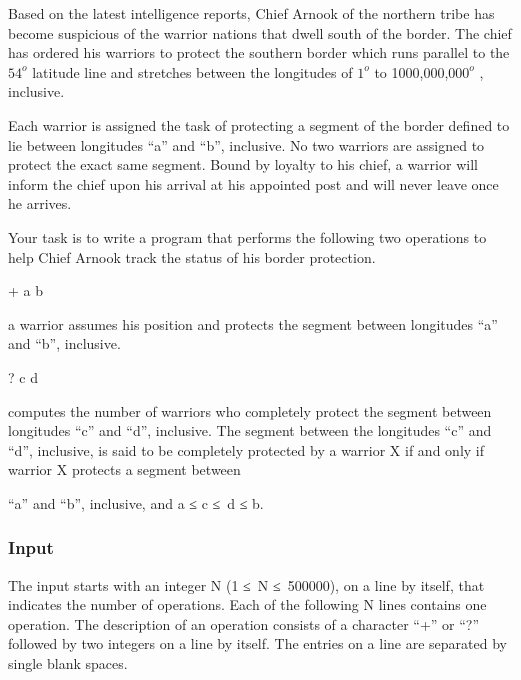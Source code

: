 



     Based on the latest intelligence reports, Chief Arnook of the northern tribe has become suspicious of the warrior nations that dwell south of the border. The chief has ordered his warriors to protect the southern border which runs parallel to the $54^{o}$     latitude line and stretches between the longitudes of $1^{o}$     to 1000,000,$000^{o}$     , inclusive.    

     Each warrior is assigned the task of protecting a segment of the border defined to lie between longitudes “a” and “b”, inclusive. No two warriors are assigned to protect the exact same segment. Bound by loyalty to his chief, a warrior will inform the chief upon his arrival at his appointed post and will never leave once he arrives.    

         Your task is to write a program that performs the following two operations                   to help Chief Arnook track the status of his border protection.         



        + a b       

        a warrior assumes his position and protects the segment between longitudes “a” and “b”, inclusive.       



        ? c d       

           computes the number of warriors who completely protect the segment between longitudes “c” and “d”, inclusive. The segment between the longitudes “c” and “d”, inclusive, is said to be completely protected by a warrior X if and only if warrior X protects a segment between          

            “a” and “b”, inclusive, and a ≤ c ≤ d ≤ b.            









\subsubsection{\textbf{        Input       }}

    The input starts with an integer N (1 ≤ N ≤ 500000), on a line by itself, that indicates the number of operations. Each of the following N lines contains one operation. The description of an operation consists of a character “+” or “?” followed by two integers on a line by itself. The entries on a line are separated by single blank spaces.   






